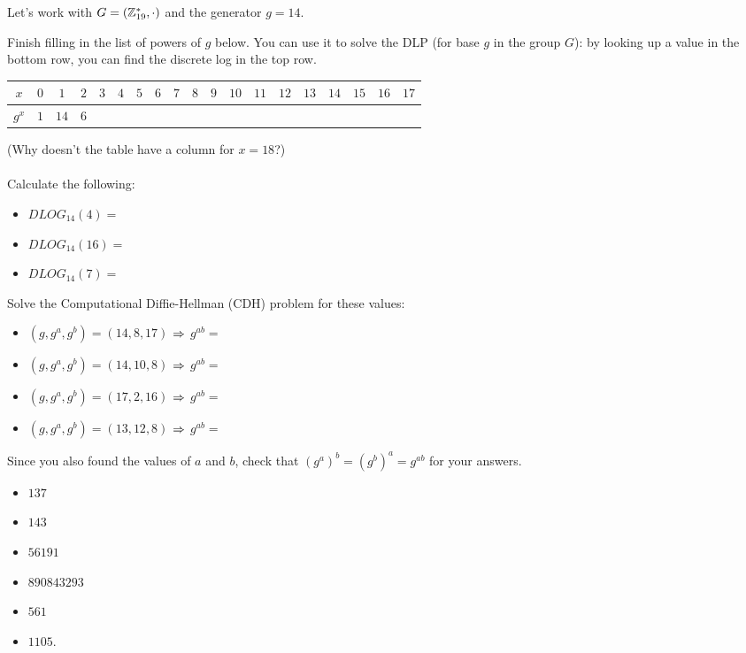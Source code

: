 \documentclass[12pt]{article}
\begin{document}
Let's work with $G = (\mathbb{Z}_{19}^*, \cdot)$ and the generator $g = 14$.

Finish filling in the list of powers of $g$ below. You can use it to solve the DLP (for base $g$ in the group $G$): by looking up a value in the bottom row, you can find the discrete log in the top row.

\begin{center}
\begin{tabular}{|c|c|c|c|c|c|c|c|c|c|c|c|c|c|c|c|c|c|c|}
\hline
$x$ & $0$ & $1$ & $2$ & $3$ & $4$ & $5$ & $ 6$ & $7$ & $8$ & $9$ & $10$ & $11$ & $12$ & $13$ & $14$ & $15$ & $16$ & $17$\\
\hline
$g^x$ & $1$ & $14$ & $6$ & & & & & & & & & & & & & & &\\
\hline
\end{tabular}
\end{center}

(Why doesn't the table have a column for $x = 18$?)\\\\

Calculate the following:

\begin{itemize}
\item $DLOG_{14}(4) =$
\item $DLOG_{14}(16) =$
\item $DLOG_{14}(7) =$
\end{itemize}

Solve the Computational Diffie-Hellman (CDH) problem for these values:

\begin{itemize}
\item $(g, g^a, g^b) = (14, 8, 17)$ $\Rightarrow$ $g^{ab} =$
\item $(g, g^a, g^b) = (14, 10, 8)$ $\Rightarrow$ $g^{ab} =$
\item $(g, g^a, g^b) = (17, 2, 16)$ $\Rightarrow$ $g^{ab} =$
\item $(g, g^a, g^b) = (13, 12, 8)$ $\Rightarrow$ $g^{ab} =$
\end{itemize}


Since you also found the values of $a$ and $b$, check that $(g^a)^b = (g^b)^a = g^{ab}$ for your answers.


\begin{itemize}
\item $137$
\item $143$
\item $56191$
\item $890843293$
\item $561$
\item $1105$.
\end{itemize}
\end{document}
